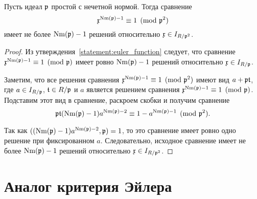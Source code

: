 \documentclass[_00_dissertation.tex]{subfiles}
\begin{document}
\begin{proposition}\label{proposition:miller_criteria_character}
    Пусть идеал $\mathfrak{p}$ простой с нечетной нормой.
    Тогда сравнение
    \begin{equation*}
        \mathfrak{x}^{\textrm{Nm}(\mathfrak{p}) - 1} \equiv 1 \pmod{\mathfrak{p}^2}
    \end{equation*}
    имеет не более $\textrm{Nm}(\mathfrak{p}) - 1$ решений относительно $\mathfrak{x} \in I_{R/\mathfrak{p}^2}$.
\end{proposition}
\begin{proof}
    Из утверждения~\ref{statement:euler_function} следует, что сравнение $\mathfrak{x}^{\textrm{Nm}(\mathfrak{p}) - 1} \equiv 1 \pmod{\mathfrak{p}}$ имеет ровно $\textrm{Nm}(\mathfrak{p}) - 1$ решений относительно $\mathfrak{x} \in I_{R/\mathfrak{p}}$.
    
    Заметим, что все решения сравнения $\mathfrak{x}^{\textrm{Nm}(\mathfrak{p}) - 1} \equiv 1 \pmod{\mathfrak{p}^2}$ имеют вид $a + \mathfrak{p}\mathfrak{t}$, где $a \in I_{R/\mathfrak{p}}$, $\mathfrak{t} \in R/\mathfrak{p}$ и $a$ является решением сравнения $\mathfrak{x}^{\textrm{Nm}(\mathfrak{p}) - 1} \equiv 1 \pmod{\mathfrak{p}}$.
    Подставим этот вид в сравнение, раскроем скобки и получим сравнение
    \begin{equation*}
        \mathfrak{p}\mathfrak{t}(\textrm{Nm}(\mathfrak{p}) - 1)a^{\textrm{Nm}(\mathfrak{p}) - 2} \equiv 1 - a^{\textrm{Nm}(\mathfrak{p}) - 1} \pmod{\mathfrak{p}^2}.
    \end{equation*}
    
    Так как $((\textrm{Nm}(\mathfrak{p}) - 1)a^{\textrm{Nm}(\mathfrak{p}) - 2}, \mathfrak{p}) = 1$, то это сравнение имеет ровно одно решение при фиксированном $a$.
    Следовательно, исходное сравнение имеет не более $\textrm{Nm}(\mathfrak{p}) - 1$ решений относительно $\mathfrak{x} \in I_{R/\mathfrak{p}^2}$.
\end{proof}

\section{Аналог критерия Эйлера}
\end{document}
